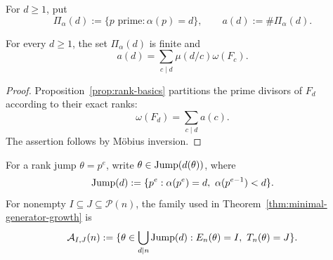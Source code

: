 For $d\geq1$, put
\[
 \Pi_\alpha(d):=\{p\text{ prime}:\alpha(p)=d\},
 \qquad a(d):=\#\Pi_\alpha(d).
\]

\begin{lemma}
\label{lem:primitive-prime-mobius-count}
For every $d\geq1$, the set $\Pi_\alpha(d)$ is finite and
\[
 a(d)=\sum_{c\mid d}\mu(d/c)\omega(F_c).
\]
\end{lemma}

\begin{proof}
Proposition~\ref{prop:rank-basics} partitions the prime divisors of $F_d$
according to their exact ranks:
\[
 \omega(F_d)=\sum_{c\mid d}a(c).
\]
The assertion follows by M\"obius inversion.
\end{proof}

For a rank jump $\theta=p^e$, write $\theta\in\operatorname{Jump}(d(\theta))$, where
\[
 \Atom(d):=\{p^e:\alpha(p^e)=d,\ \alpha(p^{e-1})<d\}.
\]
For nonempty $I\subseteq J\subseteq\mathcal P(n)$, the family used in
Theorem~\ref{thm:minimal-generator-growth} is
\[
 \mathcal A_{I,J}(n):=
 \{\theta\in\bigcup_{d\mid n}\operatorname{Jump}(d):
 E_n(\theta)=I,\ T_n(\theta)=J\}.
\]
